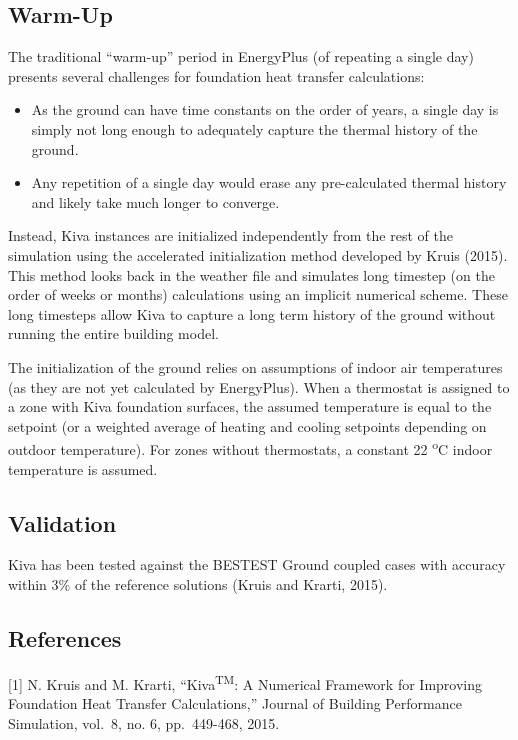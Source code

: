 \subsection{Warm-Up}\label{warm-up}

The traditional ``warm-up'' period in EnergyPlus (of repeating a single
day) presents several challenges for foundation heat transfer
calculations:

\begin{itemize}
\tightlist
\item
  As the ground can have time constants on the order of years, a single
  day is simply not long enough to adequately capture the thermal
  history of the ground.
\item
  Any repetition of a single day would erase any pre-calculated thermal
  history and likely take much longer to converge.
\end{itemize}

Instead, Kiva instances are initialized independently from the rest of the simulation using the accelerated initialization method developed by Kruis (2015). This method looks back in the weather file and simulates long timestep (on the order of weeks or months) calculations using an implicit numerical scheme. These long timesteps allow Kiva to capture a long term history of the ground without running the entire building model.

The initialization of the ground relies on assumptions of indoor air temperatures (as they are not yet calculated by EnergyPlus). When a thermostat is assigned to a zone with Kiva foundation surfaces, the assumed temperature is equal to the setpoint (or a weighted average of heating and cooling setpoints depending on outdoor temperature). For zones without thermostats, a constant 22 \textsuperscript{o}C indoor temperature is assumed.

\subsection{Validation}\label{validation}

Kiva has been tested against the BESTEST Ground coupled cases with
accuracy within 3\% of the reference solutions (Kruis and Krarti, 2015).

\subsection{References}\label{references}

{[}1{]} N. Kruis and M. Krarti, ``Kiva\textsuperscript{TM}: A Numerical
Framework for Improving Foundation Heat Transfer Calculations,'' Journal
of Building Performance Simulation, vol.~8, no. 6, pp.~449-468, 2015.


